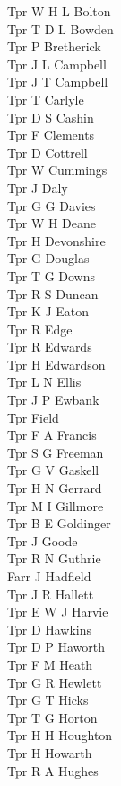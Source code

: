 \begin{multicols}{2}
  Tpr W H L Bolton \\
  Tpr T D L Bowden \\
  Tpr P Bretherick \\
  Tpr J L Campbell \\
  Tpr J T Campbell \\
  Tpr T Carlyle \\
  Tpr D S Cashin \\
  Tpr F Clements \\
  Tpr D Cottrell \\
  Tpr W Cummings \\
  Tpr J Daly \\
  Tpr G G Davies \\
  Tpr W H Deane \\
  Tpr H Devonshire \\
  Tpr G Douglas \\
  Tpr T G Downs \\
  Tpr R S Duncan \\
  Tpr K J Eaton \\
  Tpr R Edge \\
  Tpr R Edwards \\
  Tpr H Edwardson \\
  Tpr L N Ellis \\
  Tpr J P Ewbank \\
  Tpr Field \\
  Tpr F A Francis \\
  Tpr S G Freeman \\
  Tpr G V Gaskell \\
  Tpr H N Gerrard \\
  Tpr M I Gillmore \\
  Tpr B E Goldinger \\
  Tpr J Goode \\
  Tpr R N Guthrie \\
  Farr J Hadfield \\
  Tpr J R Hallett \\
  Tpr E W J Harvie \\
  Tpr D Hawkins \\
  Tpr D P Haworth \\
  Tpr F M Heath \\
  Tpr G R Hewlett \\
  Tpr G T Hicks \\
  Tpr T G Horton \\
  Tpr H H Houghton \\
  Tpr H Howarth \\
  Tpr R A Hughes \\

\end{multicols}
